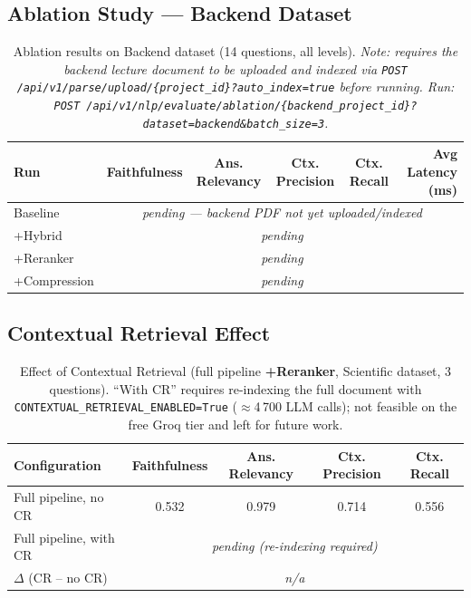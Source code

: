 \documentclass[12pt,a4paper]{article}
\begin{document}
\subsection{Ablation Study — Backend Dataset}

\begin{table}[H]
  \centering
  \caption{Ablation results on Backend dataset (14 questions, all levels).
           \emph{Note: requires the backend lecture document to be uploaded and indexed
           via \texttt{POST /api/v1/parse/upload/\{project\_id\}?auto\_index=true} before running.
           Run: \texttt{POST /api/v1/nlp/evaluate/ablation/\{backend\_project\_id\}?dataset=backend\&batch\_size=3}.}}
  \label{tab:results_backend_ablation}
  \begin{tabular}{lccccr}
    \toprule
    \textbf{Run} & \textbf{Faithfulness} & \textbf{Ans. Relevancy} & \textbf{Ctx. Precision} & \textbf{Ctx. Recall} & \textbf{Avg Latency (ms)} \\
    \midrule
    Baseline     & \multicolumn{5}{c}{\emph{pending — backend PDF not yet uploaded/indexed}} \\
    +Hybrid      & \multicolumn{5}{c}{\emph{pending}} \\
    +Reranker    & \multicolumn{5}{c}{\emph{pending}} \\
    +Compression & \multicolumn{5}{c}{\emph{pending}} \\
    \bottomrule
  \end{tabular}
\end{table}

\subsection{Contextual Retrieval Effect}
\label{sec:results_cr}

\begin{table}[H]
  \centering
  \caption{Effect of Contextual Retrieval (full pipeline \textbf{+Reranker}, Scientific dataset, 3 questions).
           ``With CR'' requires re-indexing the full document with \texttt{CONTEXTUAL\_RETRIEVAL\_ENABLED=True}
           ($\approx$4\,700 LLM calls); not feasible on the free Groq tier and left for future work.}
  \label{tab:results_cr}
  \begin{tabular}{lcccc}
    \toprule
    \textbf{Configuration} & \textbf{Faithfulness} & \textbf{Ans. Relevancy} & \textbf{Ctx. Precision} & \textbf{Ctx. Recall} \\
    \midrule
    Full pipeline, no CR  & 0.532 & 0.979 & 0.714 & 0.556 \\
    Full pipeline, with CR & \multicolumn{4}{c}{\emph{pending (re-indexing required)}} \\
    \midrule
    $\Delta$ (CR -- no CR) & \multicolumn{4}{c}{\emph{n/a}} \\
    \bottomrule
  \end{tabular}
\end{table}
\end{document}
